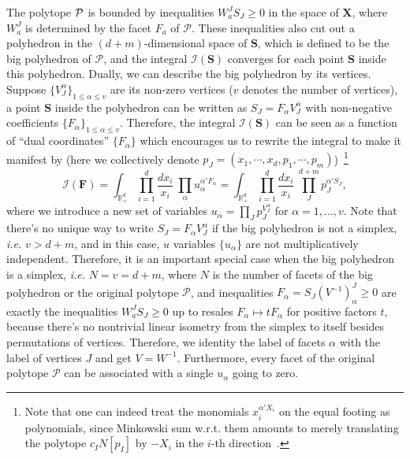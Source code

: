 \documentclass[hidelinks,12pt]{article}
\begin{document}
The polytope ${\cal P}$ is bounded by inequalities $W_a^JS_J\geq 0$ in the space of $\mathbf X$, where $W_a^J$ is determined by the facet $F_a$ of $\mathcal P$.  These inequalities also cut out a polyhedron in the $(d+m)$-dimensional space of $\mathbf S$, which is defined to be the big polyhedron of $\mathcal P$, 
and the integral $\mathcal I(\mathbf S)$ converges for each point $\mathbf S$ 
inside this polyhedron. Dually, we can describe the big polyhedron by its vertices. Suppose 
$\{V_J^\alpha\}_{1\leq \alpha \leq v}$ are its non-zero vertices ($v$ denotes the number of vertices), a point $\mathbf S$ inside 
the polyhedron can be written as $S_J = F_\alpha V^\alpha_J$ with non-negative coefficients 
$\{F_\alpha\}_{1\leq \alpha \leq v}$.  Therefore, the integral $\mathcal I(\mathbf S)$
can be seen as a function of ``dual coordinates'' $\{F_\alpha\}$ which encourages us to 
rewrite the integral to make it manifest by (here we collectively denote $p_J=(x_1, \cdots, x_d, p_1, \cdots, p_m)$)~\footnote{Note that one can indeed treat the monomials $x_i^{\alpha' X_i}$ on the equal footing as polynomials, since Minkowski sum w.r.t. them amounts to merely translating the polytope $c_I N[p_I]$ by $-X_i$ in the $i$-th direction~\cite{Arkani-Hamed:2019mrd}.}
\begin{equation}
	\mathcal I(\mathbf F)=
	\int_{\mathbb R_+^d} \prod_{i=1}^d \frac{d x_i}{x_i}~%
	\prod_{\alpha}u_\alpha^{\alpha' F_\alpha}
	=
	\int_{\mathbb R_+^d}\prod_{i=1}^d \frac{d x_i}{x_i}~%
	\prod_{J}^{d{+}m} p_J^{\alpha' S_J},
\end{equation}
where we introduce a new set of variables $u_\alpha = \prod_J p_J^{V_J^\alpha}$ for 
$\alpha=1,\dots, v$. Note that there's no unique way to write $S_J=F_\alpha V_J^\alpha$ if the big polyhedron is not a simplex, \textit{i.e.} $v>d+m$, and in this case,
$u$ variables $\{u_\alpha \}$ are not multiplicatively independent. Therefore, it is an important special case when the big polyhedron is a simplex, \textit{i.e.} $N=v=d+m$, where $N$ is 
the number of facets of the big polyhedron or the original polytope $\mathcal P$,
and inequalities $F_\alpha=S_J(V^{-1})^J_\alpha \geq 0$ are exactly the inequalities $W_a^J S_J\geq 0$ up to resales $F_\alpha \mapsto t F_\alpha$ for positive factors $t$, because
there's no nontrivial linear isometry from the simplex to itself besides permutations of vertices. Therefore, we identity the label of facets $\alpha$ with the label of 
vertices $J$ and get $V=W^{-1}$. Furthermore, every facet of the original polytope $\mathcal P$ can be associated with a single $u_\alpha$ going to zero. 
\end{document}
